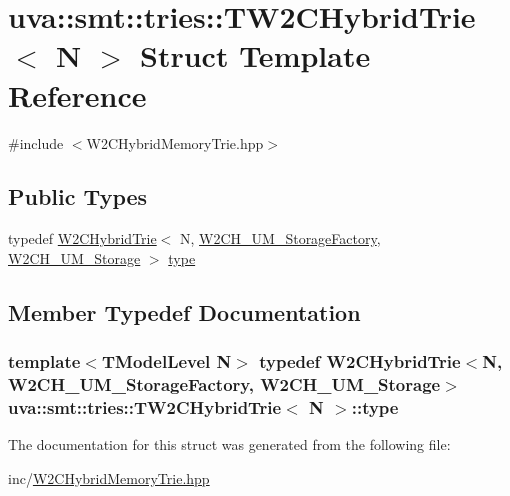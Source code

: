 \hypertarget{structuva_1_1smt_1_1tries_1_1_t_w2_c_hybrid_trie}{}\section{uva\+:\+:smt\+:\+:tries\+:\+:T\+W2\+C\+Hybrid\+Trie$<$ N $>$ Struct Template Reference}
\label{structuva_1_1smt_1_1tries_1_1_t_w2_c_hybrid_trie}


{\ttfamily \#include $<$W2\+C\+Hybrid\+Memory\+Trie.\+hpp$>$}

\subsection*{Public Types}
\begin{DoxyCompactItemize}
\item 
typedef \hyperlink{classuva_1_1smt_1_1tries_1_1_w2_c_hybrid_trie}{W2\+C\+Hybrid\+Trie}$<$ N, \hyperlink{classuva_1_1smt_1_1tries_1_1_w2_c_h___u_m___storage_factory}{W2\+C\+H\+\_\+\+U\+M\+\_\+\+Storage\+Factory}, \hyperlink{classuva_1_1smt_1_1tries_1_1_w2_c_h___u_m___storage}{W2\+C\+H\+\_\+\+U\+M\+\_\+\+Storage} $>$ \hyperlink{structuva_1_1smt_1_1tries_1_1_t_w2_c_hybrid_trie_adaace5c6183023ac2adcb71c641dad58}{type}
\end{DoxyCompactItemize}


\subsection{Member Typedef Documentation}
\hypertarget{structuva_1_1smt_1_1tries_1_1_t_w2_c_hybrid_trie_adaace5c6183023ac2adcb71c641dad58}{}
\subsubsection[{type}]{\setlength{\rightskip}{0pt plus 5cm}template$<$T\+Model\+Level N$>$ typedef {\bf W2\+C\+Hybrid\+Trie}$<$N, {\bf W2\+C\+H\+\_\+\+U\+M\+\_\+\+Storage\+Factory}, {\bf W2\+C\+H\+\_\+\+U\+M\+\_\+\+Storage}$>$ {\bf uva\+::smt\+::tries\+::\+T\+W2\+C\+Hybrid\+Trie}$<$ N $>$\+::{\bf type}}\label{structuva_1_1smt_1_1tries_1_1_t_w2_c_hybrid_trie_adaace5c6183023ac2adcb71c641dad58}


The documentation for this struct was generated from the following file\+:\begin{DoxyCompactItemize}
\item 
inc/\hyperlink{_w2_c_hybrid_memory_trie_8hpp}{W2\+C\+Hybrid\+Memory\+Trie.\+hpp}\end{DoxyCompactItemize}
